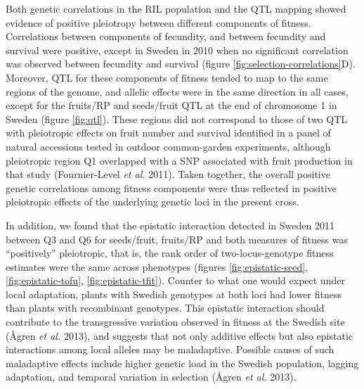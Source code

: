 \documentclass[]{article}
\begin{document}
Both genetic correlations in the RIL population and the QTL mapping showed evidence of positive pleiotropy between different components of fitness. Correlations between components of fecundity, and between fecundity and survival were positive, except in Sweden in 2010 when no significant correlation was observed between fecundity and survival (figure \ref{fig:selection-correlations}D). Moreover, QTL for these components of fitness tended to map to the same regions of the genome, and allelic effects were in the same direction in all cases, except for the fruits/RP and seeds/fruit QTL at the end of chromosome 1 in Sweden (figure \ref{fig:qtl}). These regions did not correspond to those of two QTL with pleiotropic effects on fruit number and survival identified in a panel of natural accessions tested in outdoor common-garden experiments, although pleiotropic region Q1 overlapped with a SNP associated with fruit production in that study (Fournier-Level \emph{et al.} 2011). Taken together, the overall positive genetic correlations among fitness components were thus reflected in positive pleiotropic effects of the underlying genetic loci in the present cross.

In addition, we found that the epistatic interaction detected in Sweden 2011 between Q3 and Q6 for seeds/fruit, fruits/RP and both measures of fitness was ``positively'' pleiotropic, that is, the rank order of two-locus-genotype fitness estimates were the same across phenotypes (figures \ref{fig:epistatic-seed}, \ref{fig:epistatic-tofu}, \ref{fig:epistatic-tfit}). Counter to what one would expect under local adaptation, plants with Swedish genotypes at both loci had lower fitness than plants with recombinant genotypes. This epistatic interaction should contribute to the transgressive variation observed in fitness at the Swedish site (Ågren \emph{et al.} 2013), and suggests that not only additive effects but also epistatic interactions among local alleles may be maladaptive. Possible causes of such maladaptive effects include higher genetic load in the Swedish population, lagging adaptation, and temporal variation in selection (Ågren \emph{et al.} 2013).
\end{document}
